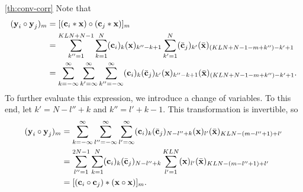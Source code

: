 \documentclass[a4paper, openany, oneside]{memoir}
\begin{document}
\begin{blockProofTheorem}{\ref{th:conv-corr}}
    Note that
    \begin{align*}
        (\boldsymbol{\mathbf{y}}_i \circ \boldsymbol{\mathbf{y}}_j)_m
        &= [(\boldsymbol{\mathbf{c}}_i \ast \boldsymbol{\mathbf{x}}) \circ (\boldsymbol{\mathbf{c}}_j \ast \boldsymbol{\mathbf{x}})]_m \\
        &=\sum_{k''=1}^{KLN+N-1}\sum_{k=1}^N (\boldsymbol{\mathbf{c}}_i)_k (\boldsymbol{\mathbf{x}})_{k''-k+1}\sum_{k'=1}^{N}(\bar{\boldsymbol{\mathbf{c}}}_j)_{k'}(\bar{\boldsymbol{\mathbf{x}}})_{(KLN+N-1-m+k'')-k'+1} \\
        &=\sum_{k=-\infty}^\infty\sum_{k'=\infty}^{\infty}\sum_{k''=-\infty}^{\infty} (\boldsymbol{\mathbf{c}}_i)_k (\bar{\boldsymbol{\mathbf{c}}}_j)_{k'}(\boldsymbol{\mathbf{x}})_{k''-k+1}(\bar{\boldsymbol{\mathbf{x}}})_{(KLN+N-1-m+k'')-k'+1}.
    \end{align*}
    To further evaluate this expression, we introduce a change of variables. To this end, let $k' = N -l'' +k$ and $k'' = l' + k - 1$. This transformation is invertible, so
    \begin{align*}
        (\boldsymbol{\mathbf{y}}_i \circ \boldsymbol{\mathbf{y}}_j)_m
        &=\sum_{k=-\infty}^\infty\sum_{l''=-\infty}^{\infty}\sum_{l'=\infty}^{\infty} (\boldsymbol{\mathbf{c}}_i)_k (\bar{\boldsymbol{\mathbf{c}}}_j)_{N -l'' +k}(\boldsymbol{\mathbf{x}})_{l'}
        (\bar{\boldsymbol{\mathbf{x}}})_{KLN-(m-l'' + 1)+l'} \\
        &=\sum_{l''=1}^{2N-1}\sum_{k=1}^{N}(\boldsymbol{\mathbf{c}}_i)_k (\bar{\boldsymbol{\mathbf{c}}}_j)_{N -l'' +k}\sum_{l'=1}^{KLN}(\boldsymbol{\mathbf{x}})_{l'}
        (\bar{\boldsymbol{\mathbf{x}}})_{KLN-(m-l'' + 1)+l'} \\
        &=[(\boldsymbol{\mathbf{c}}_i \circ \boldsymbol{\mathbf{c}}_j) \ast (\boldsymbol{\mathbf{x}} \circ \boldsymbol{\mathbf{x}})]_m.
    \end{align*}
\end{blockProofTheorem}
\end{document}
